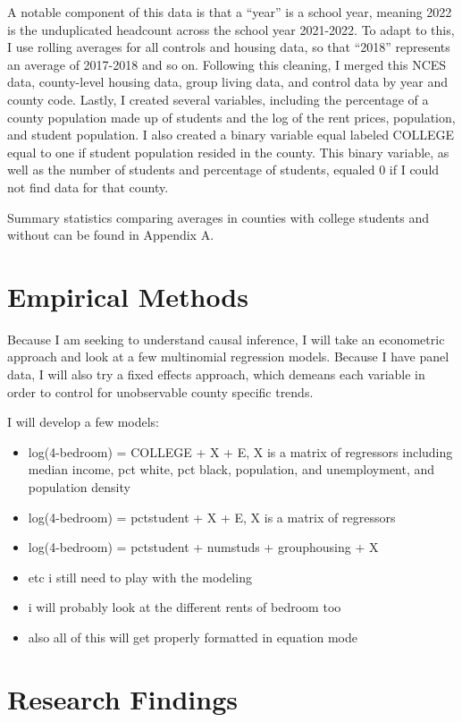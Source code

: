 \documentclass[12pt,english]{article}
\begin{document}
A notable component of this data is that a “year” is a school year, meaning 2022 is the unduplicated headcount across the school year 2021-2022. To adapt to this, I use rolling averages for all controls and housing data, so that “2018” represents an average of 2017-2018 and so on. Following this cleaning, I merged this NCES data, county-level housing data, group living data, and control data by year and county code. Lastly, I created several variables, including the percentage of a county population made up of students and the log of the rent prices, population, and student population. I also created a binary variable equal labeled COLLEGE equal to one if student population resided in the county. This binary variable, as well as the number of students and percentage of students, equaled 0 if I could not find data for that county. 

Summary statistics comparing averages in counties with college students and without can be found in Appendix A. 


\section{Empirical Methods}\label{sec:methods}
Because I am seeking to understand causal inference, I will take an econometric approach and look at a few multinomial regression models. Because I have panel data, I will also try a fixed effects approach, which demeans each variable in order to control for unobservable county specific trends. 

I will develop a few models: 
\begin{itemize}
    \item log(4-bedroom) = COLLEGE + X + E, X is a matrix of regressors including median income, pct white, pct black, population, and unemployment, and population density 
    \item log(4-bedroom) = pctstudent + X + E, X is a matrix of regressors
    \item log(4-bedroom) = pctstudent + numstuds + grouphousing + X
    \item etc i still need to play with the modeling
    \item i will probably look at the different rents of bedroom too
    \item also all of this will get properly formatted in equation mode
\end{itemize}

\section{Research Findings}\label{sec:results}
\end{document}
